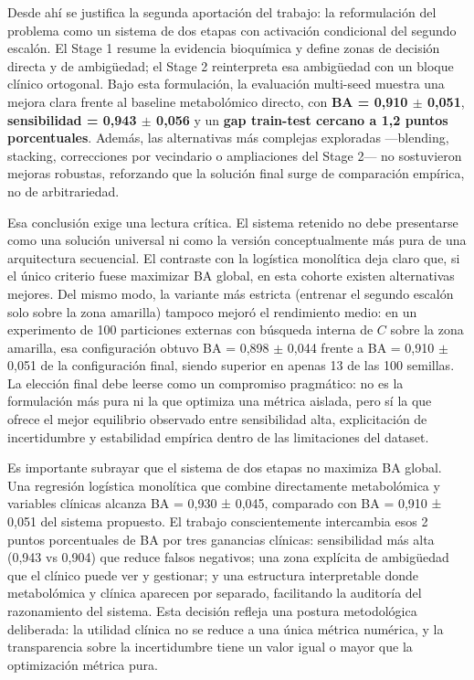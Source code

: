 Desde ahí se justifica la segunda aportación del trabajo: la reformulación del problema como un sistema de dos etapas con activación condicional del segundo escalón. El Stage 1 resume la evidencia bioquímica y define zonas de decisión directa y de ambigüedad; el Stage 2 reinterpreta esa ambigüedad con un bloque clínico ortogonal. Bajo esta formulación, la evaluación multi-seed muestra una mejora clara frente al baseline metabolómico directo, con \textbf{BA = 0,910 $\pm$ 0,051}, \textbf{sensibilidad = 0,943 $\pm$ 0,056} y un \textbf{gap train-test cercano a 1,2 puntos porcentuales}. Además, las alternativas más complejas exploradas ---blending, stacking, correcciones por vecindario o ampliaciones del Stage 2--- no sostuvieron mejoras robustas, reforzando que la solución final surge de comparación empírica, no de arbitrariedad.

Esa conclusión exige una lectura crítica. El sistema retenido no debe presentarse como una solución universal ni como la versión conceptualmente más pura de una arquitectura secuencial. El contraste con la logística monolítica deja claro que, si el único criterio fuese maximizar BA global, en esta cohorte existen alternativas mejores. Del mismo modo, la variante más estricta (entrenar el segundo escalón solo sobre la zona amarilla) tampoco mejoró el rendimiento medio: en un experimento de 100 particiones externas con búsqueda interna de $C$ sobre la zona amarilla, esa configuración obtuvo BA = 0,898 $\pm$ 0,044 frente a BA = 0,910 $\pm$ 0,051 de la configuración final, siendo superior en apenas 13 de las 100 semillas. La elección final debe leerse como un compromiso pragmático: no es la formulación más pura ni la que optimiza una métrica aislada, pero sí la que ofrece el mejor equilibrio observado entre sensibilidad alta, explicitación de incertidumbre y estabilidad empírica dentro de las limitaciones del dataset.

Es importante subrayar que el sistema de dos etapas no maximiza BA global. Una regresión logística monolítica que combine directamente metabolómica y variables clínicas alcanza BA = 0,930 ± 0,045, comparado con BA = 0,910 ± 0,051 del sistema propuesto. El trabajo conscientemente intercambia esos 2 puntos porcentuales de BA por tres ganancias clínicas: sensibilidad más alta (0,943 vs 0,904) que reduce falsos negativos; una zona explícita de ambigüedad que el clínico puede ver y gestionar; y una estructura interpretable donde metabolómica y clínica aparecen por separado, facilitando la auditoría del razonamiento del sistema. Esta decisión refleja una postura metodológica deliberada: la utilidad clínica no se reduce a una única métrica numérica, y la transparencia sobre la incertidumbre tiene un valor igual o mayor que la optimización métrica pura.

